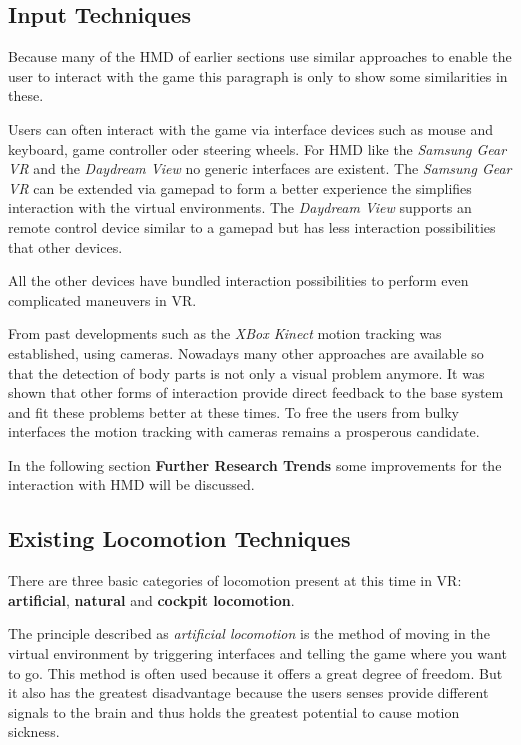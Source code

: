 \subsection{Input Techniques}
Because many of the HMD of earlier sections use similar approaches to enable 
the user to interact with the game this paragraph is only to show some 
similarities in these. 

Users can often interact with the game via interface devices such as mouse and 
keyboard, game controller oder steering wheels. For HMD like the 
\textit{Samsung Gear VR} and the \textit{Daydream View} no generic 
interfaces are existent. The \textit{Samsung Gear VR} can be extended via gamepad 
to form a better experience the simplifies interaction with the virtual 
environments. The \textit{Daydream View} supports an remote control device 
similar to a gamepad but has less interaction possibilities that other devices.

All the other devices have bundled interaction possibilities to perform even 
complicated maneuvers in VR. 

From past developments such as the \textit{XBox Kinect} motion tracking was established, using cameras. Nowadays many other approaches are available so that the detection of body parts is not only a visual problem anymore. It was shown that other forms of interaction provide direct feedback to the base system and fit these problems better at these times. To free the users from bulky interfaces the motion tracking with cameras remains a prosperous candidate.

In the following section \textbf{Further Research Trends} some improvements for 
the interaction with HMD will be discussed.

\subsection{Existing Locomotion Techniques}
\label{sec:exLocomotion}

There are three basic categories of locomotion present at this time in VR: 
\textbf{artificial}, \textbf{natural} and \textbf{cockpit locomotion}.

The principle described as \textit{artificial locomotion} is the method of 
moving in the virtual environment by triggering interfaces and telling the game 
where you want to go. This method is often used because it offers a great 
degree of freedom. But it also has the greatest disadvantage because the users 
senses provide different signals to the brain and thus holds the greatest 
potential to cause motion sickness.


